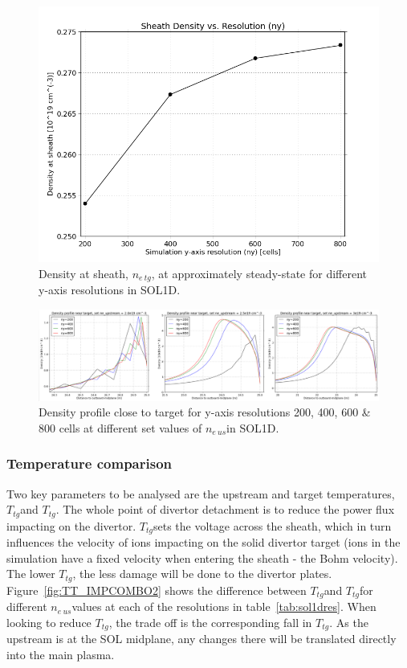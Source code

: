 \documentclass[11pt, twocolumn]{article}  %
\providecommand{\neus}{$n_{e~us}$} %
\providecommand{\netg}{$n_{e~tg}$} %
\providecommand{\Tus}{$T_{tg}$} %
\providecommand{\Ttg}{$T_{tg}$} %
\begin{document}
\begin{figure}
\includegraphics[scale=0.4]{Figures/sol1d/RichExtrp_neres.png}
\centering
\caption{Density at sheath, \netg, at approximately steady-state for different y-axis resolutions in SOL1D.}\label{fig:RichExtrp_neres}
\end{figure}


\begin{figure}
\includegraphics[scale=0.4]{Figures/sol1d/neprofneusALL.png}
\centering
\caption{Density profile close to target for y-axis resolutions 200, 400, 600 \& 800 cells at different set values of \neus in SOL1D.}\label{fig:neprofneusALL}
\end{figure}


\subsubsection{Temperature comparison}\label{sssec:tempcomp}
Two key parameters to be analysed are the upstream and target temperatures, \Tus and \Ttg. The whole point of divertor detachment is to reduce the power flux impacting on the divertor. \Ttg sets the voltage across the sheath, which in turn influences the velocity of ions impacting on the solid divertor target (ions in the simulation have a fixed velocity when entering the sheath - the Bohm velocity). The lower \Ttg, the less damage will be done to the divertor plates. Figure~\ref{fig:TT_IMPCOMBO2} shows the difference between \Tus and \Ttg for different \neus values at each of the resolutions in table~\ref{tab:sol1dres}. When looking to reduce \Ttg, the trade off is the corresponding fall in \Tus. As the upstream is at the SOL midplane, any changes there will be translated directly into the main plasma. 
\end{document}
